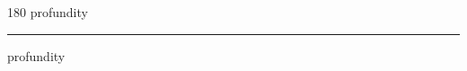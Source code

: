 
\begin{frame}
\begin{center}
\begin{turn}{180}
{\fontsize{2.5cm}{1em}\selectfont profundity}
\end{turn}
\vspace{1em}\par  
\hrule
\vspace{1em}\par  
{\fontsize{2.5cm}{1em}\selectfont profundity}
\end{center}
\end{frame}
